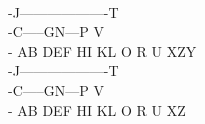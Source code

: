 \documentclass[10pt,twoside,a4paper]{article}
\begin{document}
\begin{itemize}
\\-\hspace{1cm}J-------------------T
\\-\hspace{0.5cm}C-----G\hspace{0.8cm}N---P\hspace{0.3cm} V
\\- AB   DEF  HI         KL   O   R   U         XZY
\\-\hspace{1cm}J-------------------T
\\-\hspace{0.5cm}C-----G\hspace{0.8cm}N---P\hspace{0.3cm} V
\\- AB   DEF  HI         KL   O   R   U         XZ
\end{itemize}
\end{document}
